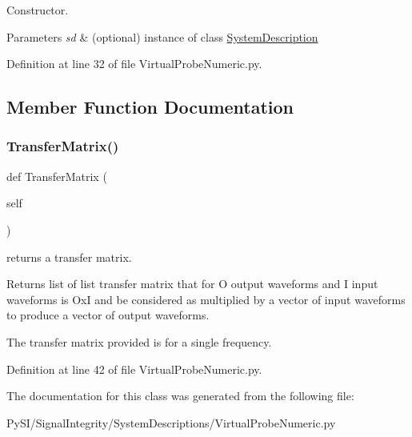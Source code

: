 Constructor. 


\begin{DoxyParams}{Parameters}
{\em sd} & (optional) instance of class \hyperlink{namespaceSignalIntegrity_1_1SystemDescriptions_1_1SystemDescription}{System\+Description} \\
\hline
\end{DoxyParams}


Definition at line 32 of file Virtual\+Probe\+Numeric.\+py.



\subsection{Member Function Documentation}
\mbox{\label{classSignalIntegrity_1_1SystemDescriptions_1_1VirtualProbeNumeric_1_1VirtualProbeNumeric_aecf838369a0d4e9037ba351539bd8eb1}} 
\subsubsection{\texorpdfstring{Transfer\+Matrix()}{TransferMatrix()}}
{\footnotesize\ttfamily def Transfer\+Matrix (\begin{DoxyParamCaption}\item[{}]{self }\end{DoxyParamCaption})}



returns a transfer matrix. 

\begin{DoxyReturn}{Returns}
list of list transfer matrix that for O output waveforms and I input waveforms is OxI and be considered as multiplied by a vector of input waveforms to produce a vector of output waveforms.
\end{DoxyReturn}
The transfer matrix provided is for a single frequency. 

Definition at line 42 of file Virtual\+Probe\+Numeric.\+py.



The documentation for this class was generated from the following file\+:\begin{DoxyCompactItemize}
\item 
Py\+S\+I/\+Signal\+Integrity/\+System\+Descriptions/Virtual\+Probe\+Numeric.\+py\end{DoxyCompactItemize}
